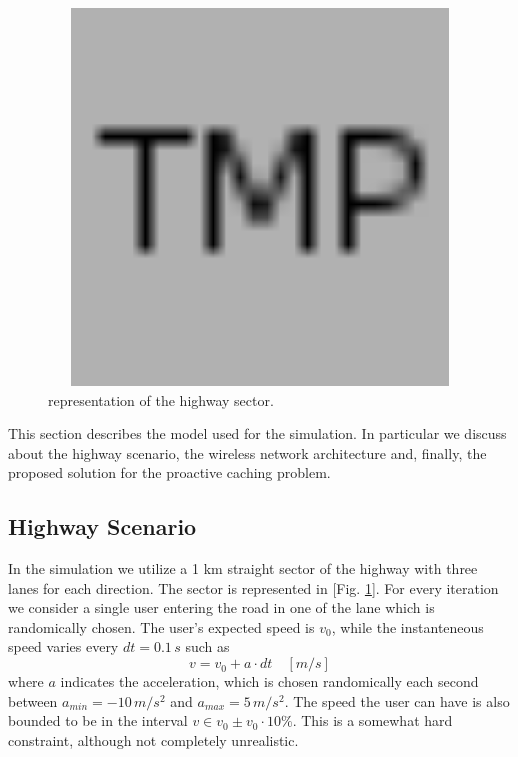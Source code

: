 \documentclass[conference,10pt]{IEEEtran}
\begin{document}
\begin{figure}
	\centering
	\includegraphics[width=18cm, height=10cm]{placeholder.png}
	\caption{representation of the highway sector.}
	\label{fig:highway_sector}
\end{figure}

This section describes the model used for the simulation. In particular we discuss about the highway scenario, the wireless network architecture and, finally, the proposed solution for the proactive caching problem.

\subsection{Highway Scenario}
In the simulation we utilize a 1 km straight sector of the highway with three lanes for each direction. The sector is represented in [Fig. \ref{fig:highway_sector}]. For every iteration we consider a single user entering the road in one of the lane which is randomically chosen. The user's expected speed is $v_0$, while the instanteneous speed varies every $dt = 0.1\, s$ such as
\begin{equation}
	\label{eq:speed}
	v = v_0+a\cdot dt \quad [m\!/\!s]
\end{equation}
where $a$ indicates the acceleration, which is chosen randomically each second between $a_{min}=-10\,m\!/\!s^2$ and $a_{max}=5\,m\!/\!s^2$. The speed the user can have is also bounded to be in the interval $v \in v_0 \pm v_0 \cdot 10\%$. This is a somewhat hard constraint, although not completely unrealistic.
\end{document}
